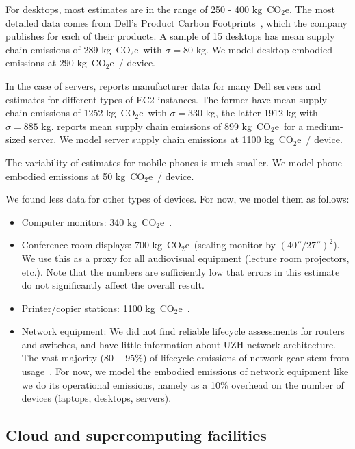 \documentclass[11pt]{article}
\newcommand{\coe}{CO$_2$e}
\newcommand{\gcoe}{g~\coe}
\newcommand{\kgcoe}{k\gcoe}
\begin{document}
For desktops, most estimates are in the range of 250 - 400 \kgcoe. The most detailed data comes from Dell's Product Carbon Footprints~\cite{dellpcf}, which the company publishes for each of their products. A sample of 15 desktops has mean supply chain emissions of 289 \kgcoe\ with $\sigma = 80$ kg. We model desktop embodied emissions at 290 \kgcoe\ / device.

In the case of servers, \textcite{davy2021} reports manufacturer data for many Dell servers and estimates for different types of EC2 instances. The former have mean supply chain emissions of 1252 \kgcoe\ with $\sigma = 330$ kg, the latter 1912 kg with $\sigma = 885$ kg. \textcite{boavizta:api} reports mean supply chain emissions of 899 \kgcoe\ for a medium-sized server. We model server supply chain emissions at 1100 \kgcoe\ / device.

The variability of estimates for mobile phones is much smaller. We model phone embodied emissions at 50 \kgcoe\ / device.

We found less data for other types of devices. For now, we model them as follows:

\begin{itemize}
  \item Computer monitors: 340 \kgcoe~\cite{dellpcf,lovehagen2023,teehan2013}.
  \item Conference room displays: 700 \kgcoe\ (scaling monitor by $(40''/27'')^2$). We use this as a proxy for all audiovisual equipment (lecture room projectors, etc.). Note that the numbers are sufficiently low that errors in this estimate do not significantly affect the overall result.
  \item Printer/copier stations: 1100 \kgcoe~\cite{ecoinvent}.
  \item Network equipment: We did not find reliable lifecycle assessments for routers and switches, and have little information about UZH network architecture. The vast majority ($80-95\%$) of lifecycle emissions of network gear stem from usage~\cite{cisco2024,jacob2023}. For now, we model the embodied emissions of network equipment like we do its operational emissions, namely as a 10\% overhead on the number of devices (laptops, desktops, servers).
\end{itemize}

\subsection{Cloud and supercomputing facilities}
\end{document}

